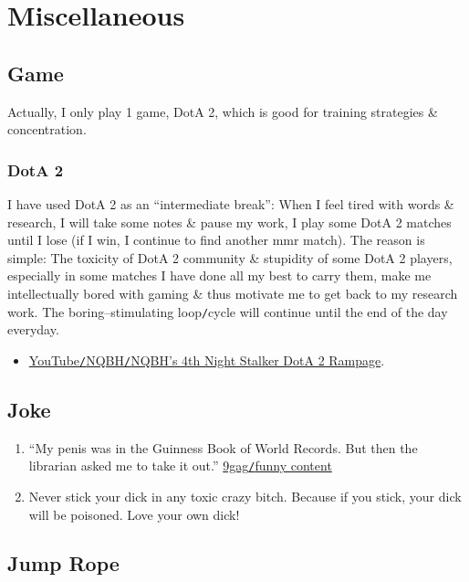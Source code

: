 \documentclass{article}
\begin{document}

\section{Miscellaneous}

\subsection{Game}
Actually, I only play 1 game, DotA 2, which is good for training strategies \& concentration.

\subsubsection{DotA 2}
I have used DotA 2 as an ``intermediate break'': When I feel tired with words \& research, I will take some notes \& pause my work, I play some DotA 2 matches until I lose (if I win, I continue to find another {\sc mmr} match). The reason is simple: The toxicity of DotA 2 community \& stupidity of some DotA 2 players, especially in some matches I have done all my best to carry them, make me intellectually bored with gaming \& thus motivate me to get back to my research work. The boring--stimulating loop{\tt/}cycle will continue until the end of the day everyday.

\begin{itemize}
	\item \href{https://www.youtube.com/watch?v=d9vmHp-4f3k}{YouTube{\tt/}NQBH{\tt/}NQBH's 4th Night Stalker DotA 2 Rampage}.
\end{itemize}

\subsection{Joke}

\begin{enumerate}
	\item ``My penis was in the Guinness Book of World Records. But then the librarian asked me to take it out.'' \href{https://9gag.com/gag/aPZPm6q}{9gag{\tt/}funny content}
	\item Never stick your dick in any toxic crazy bitch. Because if you stick, your dick will be poisoned. Love your own dick!
\end{enumerate}

\subsection{Jump Rope}
\end{document}
